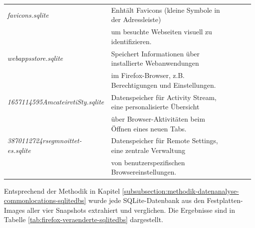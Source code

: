 \begin{appendices}
\begin{table}[h!]
{\begin{tabular}{|l|l|lll}
					\textit{favicons.sqlite}                  & Enhtält Favicons (kleine Symbole in der Adressleiste)\\&um besuchte Webseiten visuell zu identifizieren.                   &  &  &  \\ \cline{1-2}
					\textit{webappsstore.sqlite}              & Speichert Informationen über installierte Webanwendungen\\&im Firefox-Browser, z.B. Berechtigungen und Einstellungen.      &  &  &  \\ \cline{1-2}
					\textit{1657114595AmcateirvtiSty.sqlite}  & Datenspeicher für Activity Stream, eine personalisierte Übersicht\\&über Browser-Aktivitäten beim Öffnen eines neuen Tabs. &  &  &  \\ \cline{1-2}
					\textit{3870112724rsegmnoittet-es.sqlite} & Datenspeicher für Remote Settings, eine zentrale Verwaltung\\&von benutzerspezifischen Browsereinstellungen.               &  &  &  \\ \cline{1-2}
				\end{tabular}
			}
		\end{table}
		
		Entsprechend der Methodik in Kapitel \ref{subsubsection:methodik-datenanalyse-commonlocations-sqlitedbs} wurde jede SQLite-Datenbank aus den Festplatten-Images aller vier Snapshots extrahiert und verglichen.
		Die Ergebnisse sind in Tabelle \ref{tab:firefox-veraenderte-sqlitedbs} dargestellt.
		

\end{appendices}

